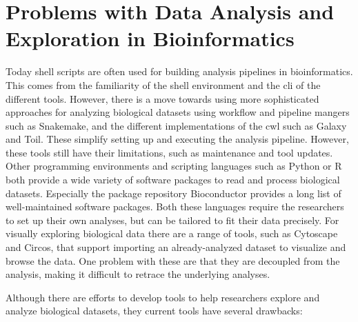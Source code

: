 \section{Problems with Data Analysis and Exploration in Bioinformatics}
Today shell scripts are often used for building analysis pipelines in
bioinformatics. This comes from the familiarity of the shell environment and the
\gls{cli} of the different tools. However, there is a move towards using more
sophisticated approaches for analyzing biological datasets using workflow and
pipeline mangers such as Snakemake\cite{koster2012snakemake}, and the different
implementations of the \gls{cwl}\cite{cwl} such as Galaxy\cite{galaxy} and
Toil\cite{toil}. These simplify setting up and executing the analysis pipeline.
However, these tools still have their limitations, such as maintenance and tool
updates. Other programming environments and scripting languages such as Python
or R both provide a wide variety of software packages to read and process
biological datasets. Especially the package repository
Bioconductor\cite{bioconductor} provides a long list of well-maintained software
packages. Both these languages require the researchers to set up their own
analyses, but can be tailored to fit their data precisely.  For visually
exploring biological data there are a range of tools, such as
Cytoscape\cite{cytoscape} and Circos\cite{circos}, that support importing an
already-analyzed dataset to visualize and browse the data. One problem with
these are that they are decoupled from the analysis, making it difficult to
retrace the underlying analyses. 

Although there are efforts to develop tools to help researchers explore and
analyze biological datasets, they current tools have several drawbacks:

